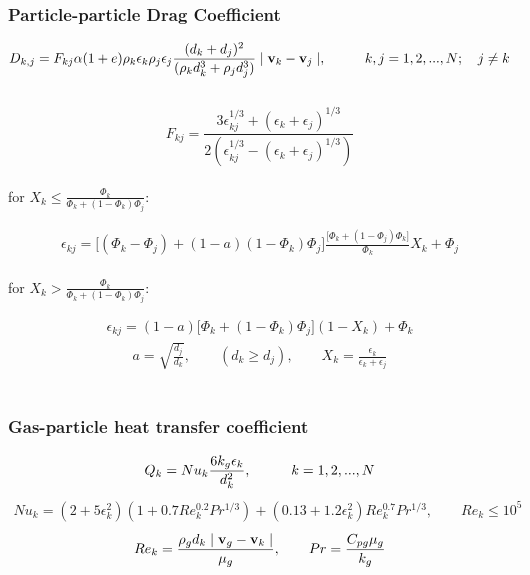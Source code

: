 \subsubsection{\hspace{1cm}Particle-particle Drag Coefficient}

\begin{equation}
D_{k,j} = F_{kj} \alpha (1+e) \rho_k \epsilon_{k} \rho_j \epsilon_{j}
\frac{(d_{k}+d_{j})^{2}}
{(\rho_{k}d_{k}^{3}+ \rho_{j}d_{j}^{3})} \mid {\bf v}_{k}-{\bf v}_{j}\mid,
\hspace{10mm} k,j = 1,2,...,N; \quad j \neq k
\label{eq:ppdrag}
\end{equation}\\

\begin{equation}
F_{kj} = \frac {3 \epsilon_{kj}^{1/3} + (\epsilon_k + \epsilon_j)^{1/3}} 
{2(\epsilon_{kj}^{1/3}-(\epsilon_k+\epsilon_j)^{1/3})}
\label{eq:effe}
\end{equation}\\

\noindent
for $\displaystyle X_k \leq \frac{\Phi_k}{\Phi_k+(1-\Phi_k)\Phi_j}$:

\begin{eqnarray}
\epsilon_{kj}=\big[(\Phi_k-\Phi_j)+(1-a)(1-\Phi_k)\Phi_j\big]
\frac {\big[\Phi_k + (1-\Phi_j)\Phi_k \big]} {\Phi_k} X_k + \Phi_j
\end{eqnarray}\\

\noindent
for $\displaystyle X_k > \frac{\Phi_k}{\Phi_k+(1-\Phi_k)\Phi_j}$:

\begin{eqnarray}
\epsilon_{kj}=(1-a)\big[\Phi_k + (1-\Phi_k)\Phi_j \big] (1-X_k) + \Phi_k
\end{eqnarray}
%
\begin{eqnarray}
a=\sqrt{\frac{d_j}{d_k}}, \qquad (d_k \geq d_j), 
\qquad X_k = \frac{\epsilon_k}{\epsilon_k + \epsilon_j}
\end{eqnarray}\\
%

\subsubsection{\hspace{1cm}Gas-particle heat transfer coefficient}

%
\begin{eqnarray}
Q_{k}=Nu_{k}\frac{6k_{g}\epsilon_{k}}{d_{k}^{2}},
\hspace{10mm} k = 1,2,...,N
\label{eq:heattr}
\end{eqnarray}
%
\begin{eqnarray}
Nu_{k} = (2 + 5 \epsilon_k^2)(1+0.7Re_{k}^{0.2}Pr^{1/3})+
(0.13+1.2\epsilon_k^2)Re_k^{0.7}Pr^{1/3}, 
\qquad Re_{k} \leq 10^5
\label{eq:nusselt}
\end{eqnarray}
%
\begin{eqnarray}
Re_{k}=\frac{\rho_{g}d_{k}\mid{\bf v}_{g}-{\bf v}_{k}\mid}{\mu_{g}},
\qquad Pr=\frac{C_{pg}\mu_{g}}{k_g}
\label{eq:reypr}
\end{eqnarray}
%

\clearpage
